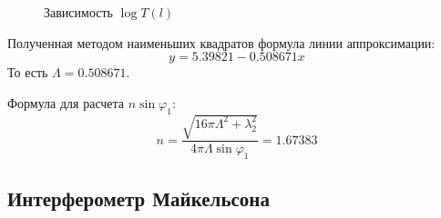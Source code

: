 \documentclass[a4paper, 12pt]{article}
\begin{document}
\begin{enumerate}
\begin{figure}[h]
			\caption{Зависимость $\log T(l)$}
		\end{figure}
		Полученная методом наименьших квадратов формула линии аппроксимации:
		\begin{equation}
			y=5.39821 - 0.508671 x
		\end{equation}
		То есть $\Lambda=0.508671$.\par
		Формула для расчета $n\sin\varphi_1$:
		\begin{equation}
			n=\frac{\sqrt{16\pi\Lambda^2+\lambda_2^2}}{4\pi\Lambda\sin\varphi_1}=1.67383
		\end{equation}
	\end{enumerate}
	\subsection{Интерферометр Майкельсона}
\end{document}
